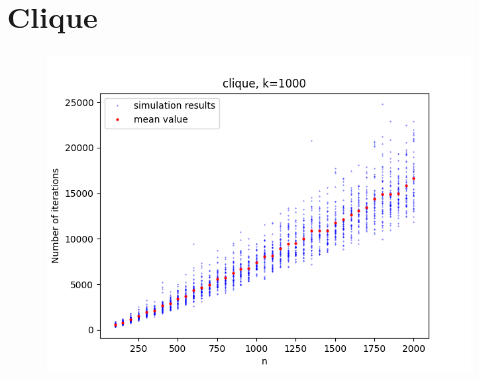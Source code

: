 \documentclass{article}
\begin{document}
\author{Jakub Ogrodowczyk}

\section{Clique}
\begin{figure}[htp]
    \centering
      \includegraphics[width=0.5\linewidth]{clique.png}
      \label{fig:clique}
\end{figure}
\end{document}
